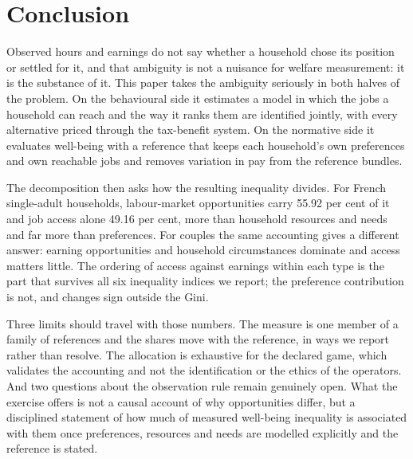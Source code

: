 \section{Conclusion}\label{conclusion}

Observed hours and earnings do not say whether a household chose its position or settled for it, and that ambiguity is not a nuisance for welfare measurement: it is the substance of it. This paper takes the ambiguity seriously in both halves of the problem. On the behavioural side it estimates a model in which the jobs a household can reach and the way it ranks them are identified jointly, with every alternative priced through the tax-benefit system. On the normative side it evaluates well-being with a reference that keeps each household's own preferences and own reachable jobs and removes variation in pay from the reference bundles.

The decomposition then asks how the resulting inequality divides. For French single-adult households, labour-market opportunities carry 55.92 per cent of it and job access alone 49.16 per cent, more than household resources and needs and far more than preferences. For couples the same accounting gives a different answer: earning opportunities and household circumstances dominate and access matters little. The ordering of access against earnings within each type is the part that survives all six inequality indices we report; the preference contribution is not, and changes sign outside the Gini.

Three limits should travel with those numbers. The measure is one member of a family of references and the shares move with the reference, in ways we report rather than resolve. The allocation is exhaustive for the declared game, which validates the accounting and not the identification or the ethics of the operators. And two questions about the observation rule remain genuinely open. What the exercise offers is not a causal account of why opportunities differ, but a disciplined statement of how much of measured well-being inequality is associated with them once preferences, resources and needs are modelled explicitly and the reference is stated.

